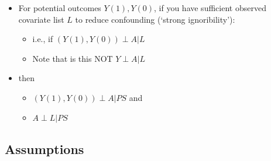 \documentclass[
]{book}
\providecommand{\tightlist}{%
  \setlength{\itemsep}{0pt}\setlength{\parskip}{0pt}}
\begin{document}
\begin{itemize}
\tightlist
\item
  For potential outcomes \(Y(1), Y(0)\), if you have sufficient observed covariate list \(L\) to reduce confounding (`strong ignoribility'):

  \begin{itemize}
  \tightlist
  \item
    i.e., if \((Y(1), Y(0)) \perp A | L\)
  \item
    Note that is this NOT \(Y \perp A | L\)
  \end{itemize}
\item
  then

  \begin{itemize}
  \tightlist
  \item
    \((Y(1), Y(0)) \perp A | PS\) and
  \item
    \(A \perp L | PS\)
  \end{itemize}
\end{itemize}

\hypertarget{assumptions}{%
\subsection{Assumptions}\label{assumptions}}
\end{document}
